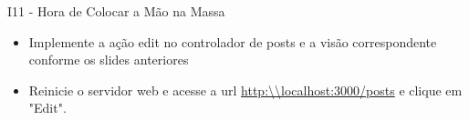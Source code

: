 \begin{frame}[t, fragile]{I11 - Hora de Colocar a Mão na Massa}
	\begin{itemize}
		\item Implemente a ação \alert{edit} no controlador de posts e a visão correspondente conforme os slides anteriores
		\item Reinicie o servidor web e acesse a url \url{http:\\localhost:3000/posts} e clique em \alert{"Edit"}.
	\end{itemize}
\end{frame}